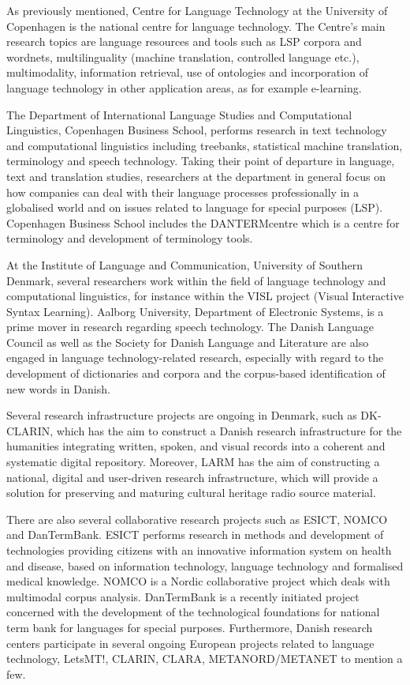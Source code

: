 \documentclass[]{../../metanetpaper}
\begin{document}
\begin{multicols}{2}
As previously mentioned, Centre for Language Technology at the University of Copenhagen is the national centre for language technology.  The Centre's main research topics are language resources and tools such as LSP corpora and wordnets, multilinguality (machine translation, controlled language etc.), multimodality, information retrieval, use of ontologies and incorporation of language technology in other application areas, as for example e-learning.

The Department of International Language Studies and Computational Linguistics, Copenhagen Business School, performs research in text technology and computational linguistics including tree\-banks, statistical machine translation, terminology and speech technology. Taking their point of departure in language, text and translation studies, researchers at the department  in general focus on how companies can deal with their language processes professionally in a globalised world and on issues related to language for special purposes (LSP). Copenhagen Business School includes the DANTERMcentre which is a centre for terminology and development of terminology tools.

At the Institute of Language and Communication, University of Southern Denmark, several researchers work within the field of language technology and computational linguistics, for instance within the VISL project (Visual Interactive Syntax Learning). Aalborg University, Department of Electronic Systems, is a prime mover in research regarding speech technology. The Danish Language Council as well as the Society for Danish Language and Literature are also engaged in language technology-related research, especially with regard to the development of dictionaries and corpora and the corpus-based identification of new words in Danish. 

Several research infrastructure projects are ongoing in Denmark, such as DK-CLARIN, which has the aim to construct a Danish research infrastructure for the humanities integrating written, spoken, and visual records into a coherent and systematic digital repository. Moreover, LARM has the aim of constructing a national, digital and user-driven research infrastructure, which will provide a solution for preserving and maturing cultural heritage radio source material. 

There are also several collaborative research projects such as ESICT, NOMCO and DanTermBank. ESICT performs research in methods and development of technologies providing citizens with an innovative information system on health and disease, based on information technology, language technology and formalised medical knowledge. NOMCO is a Nordic collaborative project which deals with multimodal corpus analysis. DanTermBank is a recently initiated project concerned with the development of the technological foundations for national term bank for languages for special purposes. Furthermore, Danish research centers participate in several ongoing European projects related to language technology, LetsMT!, CLARIN, CLARA, METANORD/METANET  to mention a few.


\end{multicols}
\end{document}
